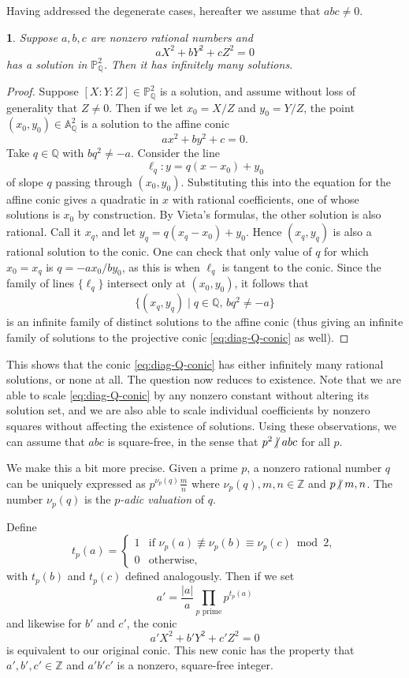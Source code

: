 \documentclass[10pt,a4paper]{amsart}
\numberwithin{equation}{section}
\numberwithin{figure}{section}
\numberwithin{table}{section}
\theoremstyle{definition}
\theoremstyle{plain}
\theoremstyle{remark}
\theoremstyle{plain}
\theoremstyle{definition}
\theoremstyle{plain}
\theoremstyle{plain}
\newtheorem{lem}[thm]{\protect\lemmaname}
\providecommand{\lemmaname}{Lemma}
\newcommand{\A}{\mathbb{A}}
\renewcommand{\P}{\mathbb{P}}
\newcommand{\Z}{\mathbb{Z}}
\newcommand{\Q}{\mathbb{Q}}
\newcommand{\ndiv}{\centernot|}
\begin{document}
	Having addressed the degenerate cases, hereafter we assume that $abc\neq 0$.
	\begin{lem}\label{lem:infinitely-many-Q-soln}
		Suppose $a,b,c$ are nonzero rational numbers and
		\begin{equation}\label{eq:diag-Q-conic}
		aX^2 + bY^2 + cZ^2 = 0
		\end{equation}
		has a solution in $\P^2_\Q$. Then it has infinitely many solutions.
	\end{lem}
	\begin{proof}
		Suppose $[X:Y:Z]\in \P^2_\Q$ is a solution, and assume without loss of generality that $Z\neq 0$. Then if we let $x_0 = X/Z$ and $y_0 = Y/Z$, the point $(x_0,y_0) \in \A^2_\Q$ is a solution to the affine conic
		\[
		ax^2 + by^2 + c = 0.
		\]
		Take $q\in \Q$ with $bq^2 \neq -a$. Consider the line
		\[
		\ell_q\colon y = q(x-x_0) + y_0
		\]
		of slope $q$ passing through $(x_0,y_0)$. Substituting this into the equation for the affine conic gives a quadratic in $x$ with rational coefficients, one of whose solutions is $x_0$ by construction. By Vieta's formulas, the other solution is also rational. Call it $x_q$, and let $y_q = q(x_q - x_0) + y_0$. Hence $(x_q,y_q)$ is also a rational solution to the conic. One can check that only value of $q$ for which $x_0 = x_q$ is $q = -ax_0 / by_0$, as this is when $\ell_q$ is tangent to the conic. Since the family of lines $\{\ell_q\}$ intersect only at $(x_0,y_0)$, it follows that
		\[
		\{(x_q,y_q) \mid q\in\Q,\, bq^2 \neq -a\}
		\]
		is an infinite family of distinct solutions to the affine conic (thus giving an infinite family of solutions to the projective conic \eqref{eq:diag-Q-conic} as well).
	\end{proof}
	This shows that the conic \eqref{eq:diag-Q-conic} has either infinitely many rational solutions, or none at all. The question now reduces to existence. Note that we are able to scale \eqref{eq:diag-Q-conic} by any nonzero constant without altering its solution set, and we are also able to scale individual coefficients by nonzero squares without affecting the existence of solutions. Using these observations, we can assume that $abc$ is square-free, in the sense that $p^2\ndiv abc$ for all $p$.
	
	We make this a bit more precise. Given a prime $p$, a nonzero rational number $q$ can be uniquely expressed as $p^{\nu_p(q)}\frac{m}{n}$ where $\nu_p(q),m,n\in\Z$ and $p\ndiv m,n$. The number $\nu_p(q)$ is the \emph{$p$-adic valuation} of $q$.
	
	Define
	\[
	t_p(a) = \begin{cases}
	1 & \text{if } \nu_p(a)\not\equiv\nu_p(b)\equiv\nu_p(c)\bmod 2,\\
	0 & \text{otherwise,}
	\end{cases}
	\]
	with $t_p(b)$ and $t_p(c)$ defined analogously. Then if we set
	\begin{equation}\label{eq:t_p-squarefree}
	a' = \frac{|a|}{a}\prod_{p \text{ prime}} p^{t_p(a)}
	\end{equation}
	and likewise for $b'$ and $c'$, the conic
	\[
	a'X^2 + b'Y^2 + c'Z^2 = 0
	\]
	is equivalent to our original conic. This new conic has the property that $a',b',c'\in \Z$ and $a'b'c'$ is a nonzero, square-free integer.
	
\end{document}
